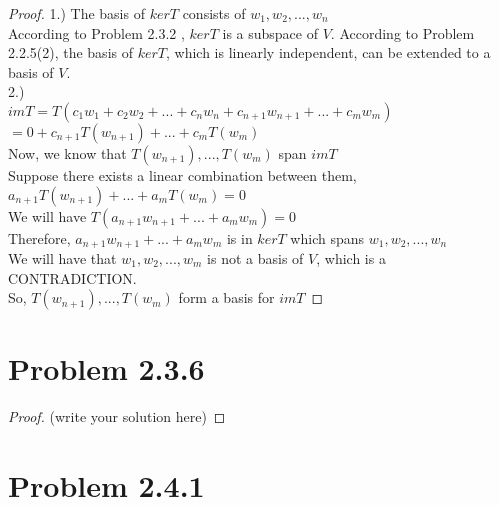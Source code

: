 \documentclass[12pt]{article}
\begin{document}
\begin{proof}
     1.) The basis of $kerT$ consists of $w_1,w_2,...,w_n$
 \\According to Problem 2.3.2 , $kerT$ is a subspace of $V$. According to Problem 2.2.5(2), the basis of $kerT$, which is linearly independent, can be extended to a basis of $V$.
 \\ 2.) \\$imT=T(c_1w_1+c_2w_2+...+c_nw_n+c_{n+1} w_{n+1}+...+c_mw_m)$
 \\$=0+c_{n+1}T(w_{n+1})+...+c_mT(w_m)$
 \\Now, we know that $T(w_{n+1}),...,T(w_m)$ span $imT$
 \\Suppose there exists a linear combination between them,
 \\$a_{n+1}T(w_{n+1})+...+a_mT(w_m)=0$
 \\We will have $T(a_{n+1} w_{n+1}+...+a_mw_m)=0$
 \\Therefore, $a_{n+1} w_{n+1}+...+a_mw_m$ is in $kerT$ which spans $w_1,w_2,...,w_n$
 \\We will have that $w_1, w_2,...,w_m$ is not a basis of $V$, which is a CONTRADICTION.
 \\So, $T(w_{n+1}),...,T(w_m)$ form a basis for $imT$
 
 
\end{proof}

\newpage 

\section{Problem 2.3.6}

\begin{proof}
	(write your solution here)
\end{proof}

\newpage 

\section{Problem 2.4.1}
\end{document}
